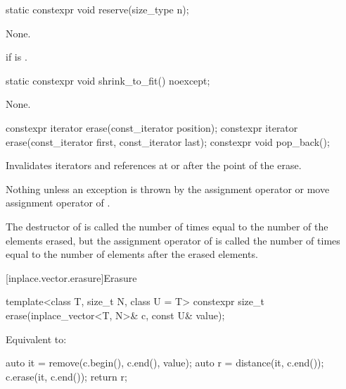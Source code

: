 %
\begin{itemdecl}
static constexpr void reserve(size_type n);
\end{itemdecl}

\begin{itemdescr}
\pnum
\effects
None.

\pnum
\throws
{} if  is .
\end{itemdescr}

%
\begin{itemdecl}
static constexpr void shrink_to_fit() noexcept;
\end{itemdecl}

\begin{itemdescr}
\pnum
\effects
None.
\end{itemdescr}

%
%
\begin{itemdecl}
constexpr iterator erase(const_iterator position);
constexpr iterator erase(const_iterator first, const_iterator last);
constexpr void pop_back();
\end{itemdecl}

\begin{itemdescr}
\pnum
\effects
Invalidates iterators and references at or after the point of the erase.

\pnum
\throws
Nothing unless an exception is thrown by
the assignment operator or move assignment operator of .

\pnum
\complexity
The destructor of  is called the number of times
equal to the number of the elements erased, but
the assignment operator of  is called the number of times
equal to the number of elements after the erased elements.
\end{itemdescr}

[inplace.vector.erasure]{Erasure}

%
\begin{itemdecl}
template<class T, size_t N, class U = T>
  constexpr size_t erase(inplace_vector<T, N>& c, const U& value);
\end{itemdecl}

\begin{itemdescr}
\pnum
\effects
Equivalent to:
\begin{codeblock}
auto it = remove(c.begin(), c.end(), value);
auto r = distance(it, c.end());
c.erase(it, c.end());
return r;
\end{codeblock}
\end{itemdescr}

